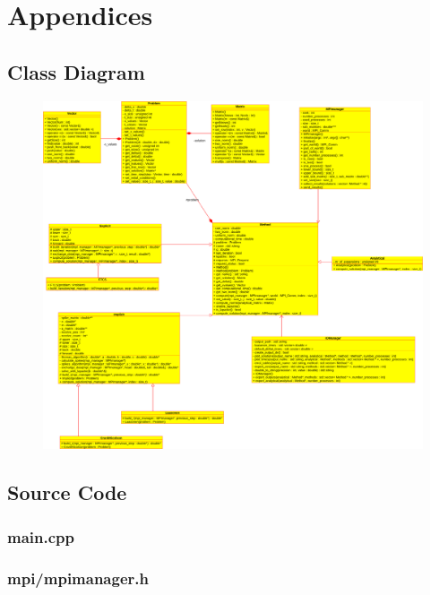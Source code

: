 \documentclass[12pt]{article}
\begin{document}
\section*{Appendices}

\subsection*{Class Diagram}

\begin{figure}[!htb]
  \centering
  \includegraphics[width=1\linewidth]{classdiagram.png}
\end{figure}

\subsection*{Source Code}

\subsubsection*{main.cpp}


\subsubsection*{mpi/mpimanager.h}

\end{document}
